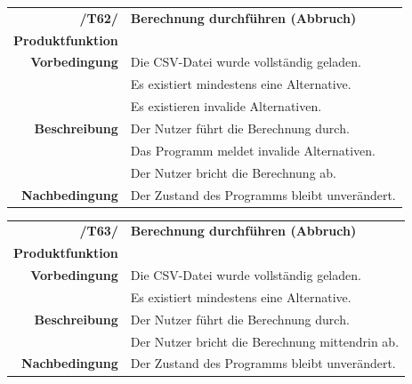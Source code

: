 \documentclass{article}
\begin{document}
\begin{table}[H]
\begin{tabularx}{\textwidth}{rX} \vspace{1mm}
\textbf{/T62/}         & \textbf{Berechnung durchführen (Abbruch)} \\ \vspace{1mm}
\textbf{Produktfunktion} & \nameref{sec:f:Berechnung durchführen} \\
\textbf{Vorbedingung}  & Die CSV-Datei wurde vollständig geladen. \\ & Es existiert mindestens eine Alternative. \\ \vspace{1mm} & Es existieren invalide Alternativen. \\
\textbf{Beschreibung}  & Der Nutzer führt die Berechnung durch. \\ & Das Programm meldet invalide Alternativen. \\ \vspace{1mm} & Der Nutzer bricht die Berechnung ab. \\
\textbf{Nachbedingung} & Der Zustand des Programms bleibt unverändert.
\end{tabularx}
\end{table}

\begin{table}[H]
\begin{tabularx}{\textwidth}{rX} \vspace{1mm}
\textbf{/T63/}         & \textbf{Berechnung durchführen (Abbruch)} \\ \vspace{1mm}
\textbf{Produktfunktion} & \nameref{sec:f:Berechnung durchführen} \\
\textbf{Vorbedingung}  & Die CSV-Datei wurde vollständig geladen. \\ \vspace{1mm} & Es existiert mindestens eine Alternative. \\
\textbf{Beschreibung}  & Der Nutzer führt die Berechnung durch. \\ \vspace{1mm} & Der Nutzer bricht die Berechnung mittendrin ab. \\
\textbf{Nachbedingung} & Der Zustand des Programms bleibt unverändert.
\end{tabularx}
\end{table}
\end{document}
